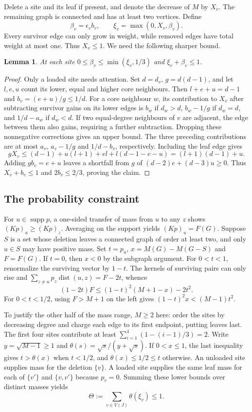 \documentclass[11pt,a4paper]{article}
\newtheorem{lemma}[theorem]{Lemma}
\theoremstyle{remark}\newtheorem{remark}[theorem]{Remark}
\DeclareMathOperator{\dist}{dist}
\DeclareMathOperator{\supp}{supp}
\begin{document}
Delete a site and its leaf if present, and denote the decrease of $M$ by $X_v$. The remaining graph is connected and has at least two vertices. Define
\[
 \beta_v=\epsilon_v b_v,\qquad \xi_v=\max(0,X_v,\beta_v).
\]
Every survivor edge can only grow in weight, while removed edges have total weight at most one. Thus $X_v\le1$. We need the following sharper bound.
\begin{lemma}\label{local}
At each site $0\le\beta_v\le\min(\xi_v,1/3)$ and $\xi_v+\beta_v\le1$.
\end{lemma}
\begin{proof}
Only a loaded site needs attention. Set $d=d_v$, $g=d(d-1)$, and let $l,e,u$ count its lower, equal and higher core neighbours. Then $l+e+u=d-1$ and $b_v=(e+u)/g\le1/d$. For a core neighbour $w$, its contribution to $X_v$ after subtracting survivor gains on its lower edges is $b_w$ if $d_w>d$, $b_w-1/g$ if $d_w=d$, and $1/d-a_w$ if $d_w<d$. If two equal-degree neighbours of $v$ are adjacent, the edge between them also gains, requiring a further subtraction. Dropping these nonnegative corrections gives an upper bound. The three preceding contributions are at most $a_v$, $a_v-1/g$ and $1/d-b_v$, respectively. Including the leaf edge gives
\[
 g X_v\le(d-1)+u(l+1)+el+l(d-1-e-u)=(l+1)(d-1)+u.
\]
Adding $gb_v=e+u$ leaves a shortfall from $g$ of $(d-2)e+(d-3)u\ge0$. Thus $X_v+b_v\le1$ and $2b_v\le2/3$, proving the claim.
\end{proof}
\subsection{The probability constraint}
For $u\in\supp p$, a one-sided transfer of mass from $u$ to any $z$ shows $(Kp)_u\ge(Kp)_z$. Averaging on the support yields $(Kp)_u=F(G)$. Suppose $S$ is a set whose deletion leaves a connected graph of order at least two, and only $u\in S$ may have positive mass. Set $t=p_u$, $x=M(G)-M(G-S)$ and $F=F(G)$. If $t=0$, then $x<0$ by the subgraph argument. For $0<t<1$, renormalize the surviving vector by $1-t$. The kernels of surviving pairs can only rise and $\sum_{z\ne u}p_z\dist(u,z)=F-2t$, whence
\[
 (1-2t)F\le (1-t)^2(M+1-x)-2t^2 .
\]
For $0<t<1/2$, using $F>M+1$ on the left gives $(1-t)^2x<(M-1)t^2$.

To justify the other half of the mass range, $M\ge2$ here: order the sites by decreasing degree and charge each edge to its first endpoint, putting leaves last. The first four sites contribute at least $\sum_{i=1}^4(1-(i-1)/3)=2$. Write $y=\sqrt{M-1}\ge1$ and $\theta(s)=\sqrt s/(y+\sqrt s)$. If $0<x\le1$, the last inequality gives $t>\theta(x)$ when $t<1/2$, and $\theta(x)\le1/2\le t$ otherwise. An unloaded site supplies mass for the deletion $\{v\}$. A loaded site supplies the same leaf mass for each of $\{v'\}$ and $\{v,v'\}$ because $p_v=0$. Summing these lower bounds over distinct masses yields
\begin{equation}
 \Theta:=\sum_{v\in V(J)}\theta(\xi_v)\le1.\label{budget}
\end{equation}
\end{document}
